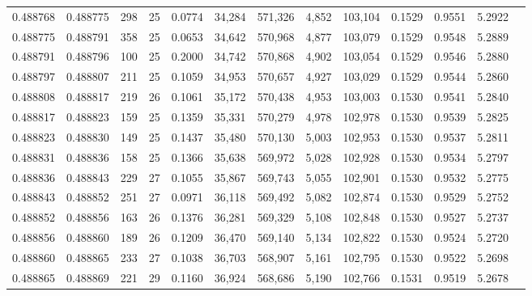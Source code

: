 \begin{tabular}{rrrrrrrrrrrrr}
0.488768 & 0.488775 & 298 &  25 &                                     0.0774 &  34,284 & 571,326 &   4,852 & 103,104 & 0.1529 & 0.9551 & 5.2922 \\
0.488775 & 0.488791 & 358 &  25 &                                     0.0653 &  34,642 & 570,968 &   4,877 & 103,079 & 0.1529 & 0.9548 & 5.2889 \\
0.488791 & 0.488796 & 100 &  25 &                                     0.2000 &  34,742 & 570,868 &   4,902 & 103,054 & 0.1529 & 0.9546 & 5.2880 \\
0.488797 & 0.488807 & 211 &  25 &                                     0.1059 &  34,953 & 570,657 &   4,927 & 103,029 & 0.1529 & 0.9544 & 5.2860 \\
0.488808 & 0.488817 & 219 &  26 &                                     0.1061 &  35,172 & 570,438 &   4,953 & 103,003 & 0.1530 & 0.9541 & 5.2840 \\
0.488817 & 0.488823 & 159 &  25 &                                     0.1359 &  35,331 & 570,279 &   4,978 & 102,978 & 0.1530 & 0.9539 & 5.2825 \\
0.488823 & 0.488830 & 149 &  25 &                                     0.1437 &  35,480 & 570,130 &   5,003 & 102,953 & 0.1530 & 0.9537 & 5.2811 \\
0.488831 & 0.488836 & 158 &  25 &                                     0.1366 &  35,638 & 569,972 &   5,028 & 102,928 & 0.1530 & 0.9534 & 5.2797 \\
0.488836 & 0.488843 & 229 &  27 &                                     0.1055 &  35,867 & 569,743 &   5,055 & 102,901 & 0.1530 & 0.9532 & 5.2775 \\
0.488843 & 0.488852 & 251 &  27 &                                     0.0971 &  36,118 & 569,492 &   5,082 & 102,874 & 0.1530 & 0.9529 & 5.2752 \\
0.488852 & 0.488856 & 163 &  26 &                                     0.1376 &  36,281 & 569,329 &   5,108 & 102,848 & 0.1530 & 0.9527 & 5.2737 \\
0.488856 & 0.488860 & 189 &  26 &                                     0.1209 &  36,470 & 569,140 &   5,134 & 102,822 & 0.1530 & 0.9524 & 5.2720 \\
0.488860 & 0.488865 & 233 &  27 &                                     0.1038 &  36,703 & 568,907 &   5,161 & 102,795 & 0.1530 & 0.9522 & 5.2698 \\
0.488865 & 0.488869 & 221 &  29 &                                     0.1160 &  36,924 & 568,686 &   5,190 & 102,766 & 0.1531 & 0.9519 & 5.2678 \\

\end{tabular}
